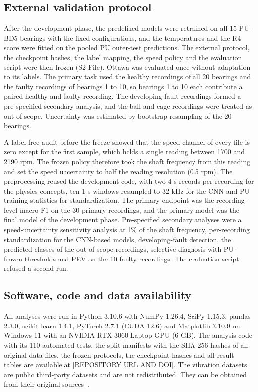 \documentclass[10pt,letterpaper]{article}
\begin{document}
\subsection*{External validation protocol}
After the development phase, the predefined models were retrained on all 15 PU-BD5 bearings with the fixed configurations, and the temperatures and the R4 score were fitted on the pooled PU outer-test predictions. The external protocol, the checkpoint hashes, the label mapping, the speed policy and the evaluation script were then frozen (S2 File). Ottawa was evaluated once without adaptation to its labels. The primary task used the healthy recordings of all 20 bearings and the faulty recordings of bearings 1 to 10, so bearings 1 to 10 each contribute a paired healthy and faulty recording. The developing-fault recordings formed a pre-specified secondary analysis, and the ball and cage recordings were treated as out of scope. Uncertainty was estimated by bootstrap resampling of the 20 bearings.

A label-free audit before the freeze showed that the speed channel of every file is zero except for the first sample, which holds a single reading between 1700 and 2190 rpm. The frozen policy therefore took the shaft frequency from this reading and set the speed uncertainty to half the reading resolution (0.5 rpm). The preprocessing reused the development code, with two 4-s records per recording for the physics concepts, ten 1-s windows resampled to 32 kHz for the CNN and PU training statistics for standardization. The primary endpoint was the recording-level macro-F1 on the 30 primary recordings, and the primary model was the final model of the development phase. Pre-specified secondary analyses were a speed-uncertainty sensitivity analysis at 1\% of the shaft frequency, per-recording standardization for the CNN-based models, developing-fault detection, the predicted classes of the out-of-scope recordings, selective diagnosis with PU-frozen thresholds and PEV on the 10 faulty recordings. The evaluation script refused a second run.

\subsection*{Software, code and data availability}
All analyses were run in Python 3.10.6 with NumPy 1.26.4, SciPy 1.15.3, pandas 2.3.0, scikit-learn 1.4.1, PyTorch 2.7.1 (CUDA 12.6) and Matplotlib 3.10.9 on Windows 11 with an NVIDIA RTX 3060 Laptop GPU (6 GB). The analysis code with its 110 automated tests, the split manifests with the SHA-256 hashes of all original data files, the frozen protocols, the checkpoint hashes and all result tables are available at [REPOSITORY URL AND DOI]. The vibration datasets are public third-party datasets and are not redistributed. They can be obtained from their original sources~\cite{paderborn2016KAtData,sehri2023uoredData,jung2023kaistData}.
\end{document}
